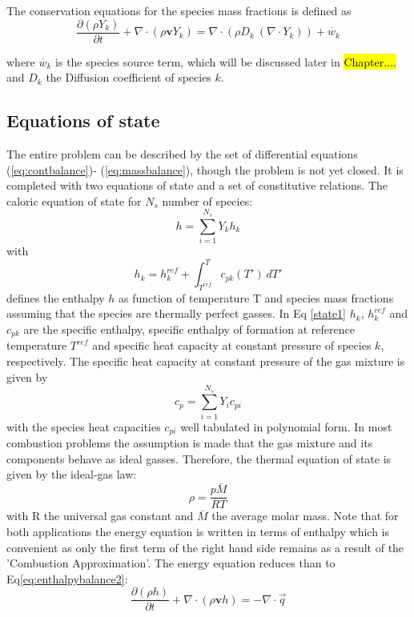 The conservation equations for the species mass fractions is defined as
\begin{equation}
\frac{\partial (\rho Y_k)}{\partial t} + \nabla \cdot \left( \rho \mathbf{v} Y_k\right)
= \nabla \cdot \left( \rho D_k \ \left(\nabla \cdot Y_k\right) \right) + \dot{w_k}
\label{eq:massbalance}
\end{equation}


where $\dot{w_k}$ is the species source term, which will be  discussed later in \hl{Chapter....} and $D_k$ the Diffusion coefficient of species $k$.

\subsection{Equations of state}
The entire problem can be described by the set of differential equations (\ref{eq:contbalance})- (\ref{eq:massbalance}), though the problem is not yet closed. It is completed with two equations of state and a set of constitutive relations. The caloric equation of state for $N_s$ number of species: 
\begin{equation}
h = \sum_{i=1}^{N_s} Y_kh_k
\end{equation}
with 
\begin{equation}
h_k = h_k^{ref} +\int_{T^{ref}}^{T}c_{pk}(T') \ dT'
\label{state1}
\end{equation}
defines the enthalpy $h$ as function of temperature T and species mass fractions assuming that the species are thermally perfect gasses. In Eq \ref{state1} $h_k$, $h_k^{ref}$ and $c_{pk}$ are the specific enthalpy, specific enthalpy of formation at reference temperature $T^{ref}$ and specific heat capacity at constant pressure of species $k$, respectively. The specific heat capacity at constant pressure of the gas mixture is given by
\begin{equation}
c_p = \sum_{i=1}^{N_s} Y_i c_{pi}
\end{equation}
with the species heat capacities $c_{pi}$ well tabulated in polynomial form. In most combustion problems the assumption is made that the gas mixture and its components behave as ideal gasses. Therefore, the thermal equation of state is given by the ideal-gas law:
\begin{equation}
\rho = \frac{p\bar{M}}{RT}
\end{equation}
with R the universal gas constant and $\bar{M}$ the average molar mass. 
Note that for both applications the energy equation is written in terms of enthalpy which is convenient as only the first term of the right hand side remains as a result of the 'Combustion Approximation'.  The energy equation reduces than to Eq\ref{eq:enthalpybalance2}:
\begin{equation}
\frac{\partial (\rho h)}{\partial t} + \nabla \cdot (\rho \boldsymbol{v}  h) 
= - \nabla \cdot \vec{q}
\label{eq:enthalpybalance2}
\end{equation}

